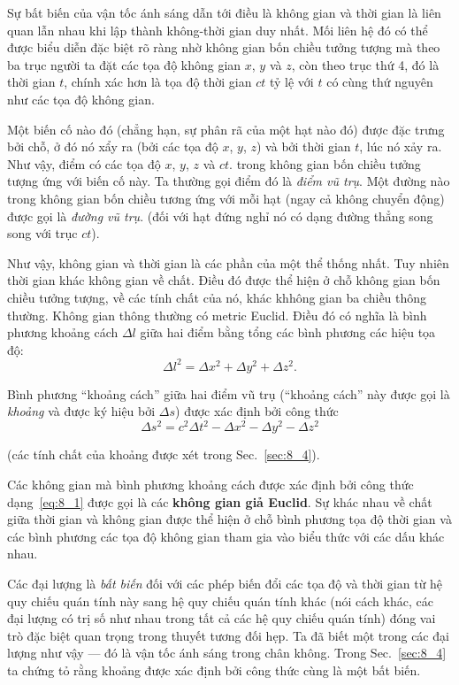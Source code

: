 Sự bất biến của vận tốc ánh sáng dẫn tới điều là không gian và thời gian là liên quan lẫn nhau khi lập thành không-thời gian duy nhất. Mối liên hệ đó có thể được biểu diễn đặc biệt rõ ràng nhờ không gian bốn chiều tưởng tượng mà theo ba trục người ta đặt các tọa độ không gian $x$, $y$ và $z$, còn theo trục thứ 4, đó là thời gian $t$, chính xác hơn là tọa độ thời gian $ct$ tỷ lệ với $t$ có cùng thứ nguyên như các tọa độ không gian.

Một biến cố nào đó (chẳng hạn, sự phân rã của một hạt nào đó) được đặc trưng bởi chỗ, ở đó nó xẩy ra (bởi các tọa độ $x$, $y$, $z$) và bởi thời gian $t$, lúc nó xảy ra. Như vậy, điểm có các tọa độ $x$, $y$, $z$ và $ct$. trong không gian bốn chiều tưởng tượng ứng với biến cố này. Ta thường gọi điểm đó là \textit{điểm vũ trụ}. Một đường nào trong không gian bốn chiều tương ứng với mỗi hạt (ngay cả không chuyển động) được gọi là \textit{đường vũ trụ}. (đối với hạt đứng nghỉ nó có dạng đường thẳng song song với trục $ct$).

Như vậy, không gian và thời gian là các phần của một thể thống nhất. Tuy nhiên thời gian khác không gian về chất. Điều đó được thể hiện ở chỗ không gian bốn chiều tưởng tượng, về các tính chất của nó, khác khhông gian ba chiều thông thường. Không gian thông thường có metric Euclid. Điều đó có nghĩa là bình phương khoảng cách $\Delta l$ giữa hai điểm bằng tổng các bình phương các hiệu tọa độ:
\begin{equation*}
	\Delta l^2 = \Delta x^2 + \Delta y^2 + \Delta z^2.
\end{equation*}

Bình phương ``khoảng cách'' giữa hai điểm vũ trụ (``khoảng cách'' này được gọi là \textit{khoảng} và được ký hiệu bởi $\Delta s$) được xác định bởi công thức
\begin{equation}\label{eq:8_1}
	\Delta s^2 = c^2\Delta t^2 - \Delta x^2 - \Delta y^2 - \Delta z^2
\end{equation}

\noindent
(các tính chất của khoảng được xét trong Sec.~\ref{sec:8_4}).

Các không gian mà bình phương khoảng cách được xác định bởi công thức dạng~\eqref{eq:8_1} được gọi là các \textbf{không gian giả Euclid}. Sự khác nhau về chất giữa thời gian và không gian được thể hiện ở chỗ bình phương tọa độ thời gian và các bình phương các tọa độ không gian tham gia vào biểu thức  với các dấu khác nhau.

Các đại lượng là \textit{bất biến} đối với các phép biến đổi các tọa độ và thời gian từ hệ quy chiếu quán tính này sang hệ quy chiếu quán tính khác (nói cách khác, các đại lượng có trị số như nhau trong tất cả các hệ quy chiếu quán tính) đóng vai trò đặc biệt quan trọng trong thuyết tương đối hẹp. Ta đã biết một trong các đại lượng như vậy --- đó là vận tốc ánh sáng trong chân không. Trong Sec.~\ref{sec:8_4} ta chứng tỏ rằng khoảng được xác định bởi công thức  cùng là một bất biến.


